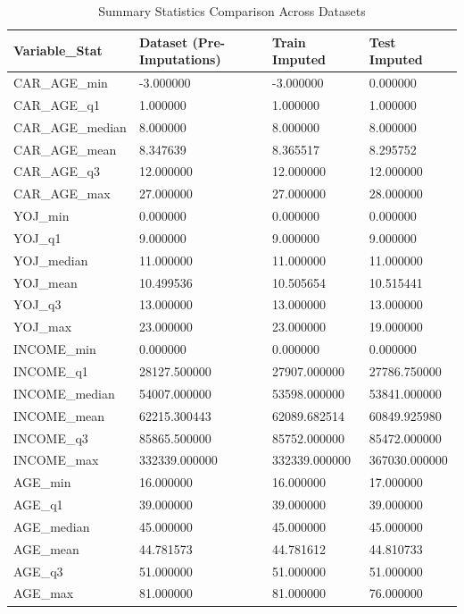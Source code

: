 \documentclass[
]{article}
\begin{document}
\begin{table}[H]
\centering\centering
\caption{\label{tab:summary stats post imputations}Summary Statistics Comparison Across Datasets}
\centering
\begin{tabular}[t]{l|l|l|l}
\hline
Variable\_Stat & Dataset (Pre-Imputations) & Train Imputed & Test Imputed\\
\hline
CAR\_AGE\_min & -3.000000 & -3.000000 & 0.000000\\
\hline
CAR\_AGE\_q1 & 1.000000 & 1.000000 & 1.000000\\
\hline
CAR\_AGE\_median & 8.000000 & 8.000000 & 8.000000\\
\hline
CAR\_AGE\_mean & 8.347639 & 8.365517 & 8.295752\\
\hline
CAR\_AGE\_q3 & 12.000000 & 12.000000 & 12.000000\\
\hline
CAR\_AGE\_max & 27.000000 & 27.000000 & 28.000000\\
\hline
YOJ\_min & 0.000000 & 0.000000 & 0.000000\\
\hline
YOJ\_q1 & 9.000000 & 9.000000 & 9.000000\\
\hline
YOJ\_median & 11.000000 & 11.000000 & 11.000000\\
\hline
YOJ\_mean & 10.499536 & 10.505654 & 10.515441\\
\hline
YOJ\_q3 & 13.000000 & 13.000000 & 13.000000\\
\hline
YOJ\_max & 23.000000 & 23.000000 & 19.000000\\
\hline
INCOME\_min & 0.000000 & 0.000000 & 0.000000\\
\hline
INCOME\_q1 & 28127.500000 & 27907.000000 & 27786.750000\\
\hline
INCOME\_median & 54007.000000 & 53598.000000 & 53841.000000\\
\hline
INCOME\_mean & 62215.300443 & 62089.682514 & 60849.925980\\
\hline
INCOME\_q3 & 85865.500000 & 85752.000000 & 85472.000000\\
\hline
INCOME\_max & 332339.000000 & 332339.000000 & 367030.000000\\
\hline
AGE\_min & 16.000000 & 16.000000 & 17.000000\\
\hline
AGE\_q1 & 39.000000 & 39.000000 & 39.000000\\
\hline
AGE\_median & 45.000000 & 45.000000 & 45.000000\\
\hline
AGE\_mean & 44.781573 & 44.781612 & 44.810733\\
\hline
AGE\_q3 & 51.000000 & 51.000000 & 51.000000\\
\hline
AGE\_max & 81.000000 & 81.000000 & 76.000000\\
\hline
\end{tabular}
\end{table}
\end{document}
